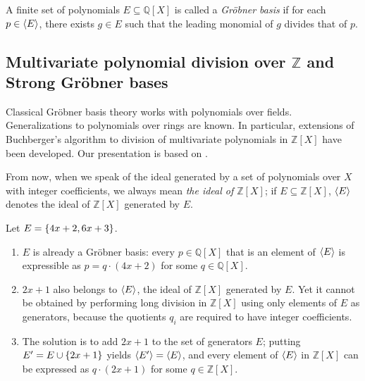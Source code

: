 \documentclass[numbers=enddot]{scrartcl}
\newcommand{\ints}{\mathbb{Z}}
\newcommand{\rats}{\mathbb{Q}}
\begin{document}
\begin{dfn} 
  A finite set of polynomials $E \subseteq \rats[X]$ is called a \emph{Gr\"obner basis} if
  for each $p \in {\left\langle{E}\right\rangle}$, there exists $g \in E$ such that the leading monomial of $g$ 
  divides that of $p$.
\item 

\end{dfn}

\subsection{Multivariate polynomial division over $\ints$ and Strong Gr\"obner bases}

Classical Gr\"obner basis theory works with polynomials over fields. 
Generalizations to polynomials over rings are known. 
In particular, extensions of Buchberger's algorithm to division of multivariate polynomials 
in $\ints[X]$ have been developed. Our presentation is based on \cite[Ch.10]{GB}.

From now, when we speak of the ideal generated by a set of polynomials over $X$ with integer coefficients, 
we always mean \emph{the ideal of $\ints[X]$}; if $E \subseteq \ints[X]$, ${\left\langle{E}\right\rangle}$ denotes 
the ideal of $\ints[X]$ generated by $E$.

\begin{expl} Let $E = \left\{4x + 2, 6x+3\right\}$. 
  \begin{enumerate} 
  \item $E$ is already a Gr\"obner basis: every $p \in \rats[X]$ that is 
  an element of ${\left\langle{E}\right\rangle}$ is expressible as $p = q \cdot (4x + 2)$ for some $q \in \rats[X]$.

  \item $2x + 1$ also belongs to ${\left\langle{E}\right\rangle}$, the ideal of $\ints[X]$ generated by $E$. Yet it cannot be obtained by 
    performing long division in $\ints[X]$ using only elements of $E$ as generators, because the 
    quotients $q_i$ are required to have integer coefficients.

    \item The solution is to add $2x + 1$ to the set of generators $E$; putting $E' = E \cup \left\{2x + 1\right\}$ 
      yields ${\left\langle{E'}\right\rangle} = {\left\langle{E}\right\rangle}$, and every element of ${\left\langle{E}\right\rangle}$ in $\ints[X]$ can be expressed as 
      $q \cdot (2x + 1)$ for some $q \in \ints[X]$.
  \end{enumerate}
\end{expl}
\end{document}
